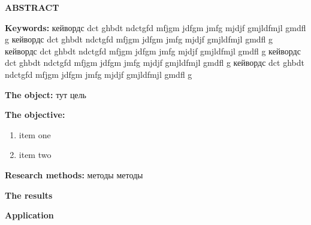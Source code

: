\newpage
\begin{center}
	\textbf{\large ABSTRACT}
\end{center}

\textbf{Keywords:} кейвордс dct ghbdt ndctgfd mfjgm jdfgm jmfg mjdjf gmjldfmjl gmdfl g
кейвордс dct ghbdt ndctgfd mfjgm jdfgm jmfg mjdjf gmjldfmjl gmdfl g
кейвордс dct ghbdt ndctgfd mfjgm jdfgm jmfg mjdjf gmjldfmjl gmdfl g
кейвордс dct ghbdt ndctgfd mfjgm jdfgm jmfg mjdjf gmjldfmjl gmdfl g
кейвордс dct ghbdt ndctgfd mfjgm jdfgm jmfg mjdjf gmjldfmjl gmdfl g

\textbf{The object:} тут цель

\textbf{The objective:}
\begin{enumerate}
	\item item one
	\item item two
\end{enumerate}


\textbf{Research methods:} методы методы

\textbf{The results}

\textbf{Application}